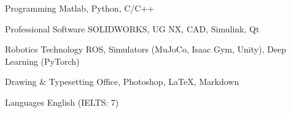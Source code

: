 \vspace{-3.0mm}
\vspace{-3.0mm}
\begin{cvskills}
\cvskill
   {Programming} %
    {Matlab, Python, C/C++} %

  \cvskill
   {Professional Software} %
   {SOLIDWORKS, UG NX, CAD, Simulink, Qt} %

  \cvskill
   {Robotics Technology} %
   {ROS, Simulators (MuJoCo, Isaac Gym, Unity), Deep Learning (PyTorch)} %
   
  \cvskill
{Drawing \& Typesetting} %
{Office, Photoshop, \textrm{\LaTeX}, Markdown} %

  \cvskill
   {Languages} %
   {English (IELTS: 7)} %
 \vspace{-9.0mm}  
\end{cvskills}
